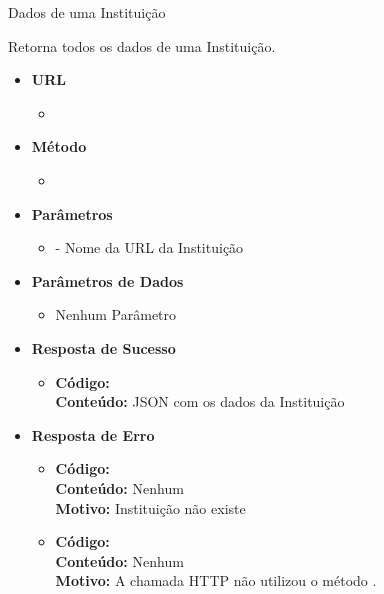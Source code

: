 
\begin{caixa}{Dados de uma Instituição}{}

Retorna todos os dados de uma Instituição.

\begin{itemize}
\item \textbf{URL}
	\begin{itemize}
		\item {}
	\end{itemize}

\item \textbf{Método}
	\begin{itemize}
		\item {}
	\end{itemize}

\item \textbf{Parâmetros}
	\begin{itemize}
		\item {} - Nome da URL da Instituição
	\end{itemize}

\item \textbf{Parâmetros de Dados}
	\begin{itemize}
		\item Nenhum Parâmetro
	\end{itemize}

\item \textbf{Resposta de Sucesso}
	\begin{itemize}
		\item \textbf{Código:}  \\ \textbf{Conteúdo:} JSON com os dados da Instituição
	\end{itemize}

\item \textbf{Resposta de Erro}
	\begin{itemize}
		\item \textbf{Código:}  \\ \textbf{Conteúdo:} Nenhum \\ \textbf{Motivo:} Instituição não existe
        \item \textbf{Código:}  \\ \textbf{Conteúdo:} Nenhum \\ \textbf{Motivo:} A chamada HTTP não utilizou o método .
	\end{itemize}

\end{itemize}
\end{caixa}

